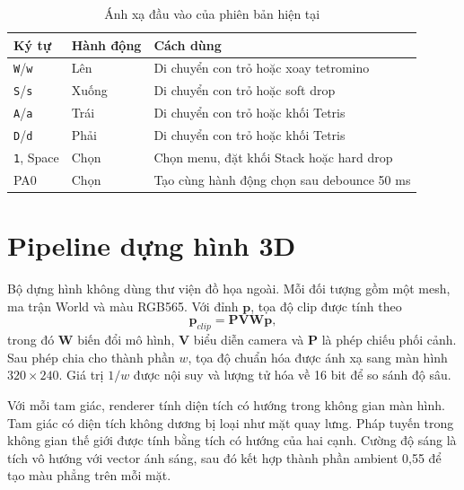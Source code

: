 \begin{table}[H]
  \centering
  \caption{Ánh xạ đầu vào của phiên bản hiện tại}
  \label{tab:controls}
  \begin{tabularx}{0.78\textwidth}{@{}C{0.18\textwidth}Y Y@{}}
    \toprule
    \textbf{Ký tự}        & \textbf{Hành động} & \textbf{Cách dùng}                         \\
    \midrule
    \texttt{W}/\texttt{w} & Lên                & Di chuyển con trỏ hoặc xoay tetromino      \\
    \texttt{S}/\texttt{s} & Xuống              & Di chuyển con trỏ hoặc soft drop           \\
    \texttt{A}/\texttt{a} & Trái               & Di chuyển con trỏ hoặc khối Tetris         \\
    \texttt{D}/\texttt{d} & Phải               & Di chuyển con trỏ hoặc khối Tetris         \\
    \texttt{1}, Space     & Chọn               & Chọn menu, đặt khối Stack hoặc hard drop   \\
    PA0                   & Chọn               & Tạo cùng hành động chọn sau debounce 50 ms \\
    \bottomrule
  \end{tabularx}
\end{table}

\section{Pipeline dựng hình 3D}

Bộ dựng hình không dùng thư viện đồ họa ngoài. Mỗi đối tượng gồm một mesh, ma trận World và màu RGB565. Với đỉnh $\mathbf{p}$, tọa độ clip được tính theo
\begin{equation}
  \mathbf{p}_{clip}=\mathbf{P}\mathbf{V}\mathbf{W}\mathbf{p},
  \label{eq:mvp}
\end{equation}
trong đó $\mathbf{W}$ biến đổi mô hình, $\mathbf{V}$ biểu diễn camera và $\mathbf{P}$ là phép chiếu phối cảnh. Sau phép chia cho thành phần $w$, tọa độ chuẩn hóa được ánh xạ sang màn hình $320\times240$. Giá trị $1/w$ được nội suy và lượng tử hóa về 16 bit để so sánh độ sâu.

Với mỗi tam giác, renderer tính diện tích có hướng trong không gian màn hình. Tam giác có diện tích không dương bị loại như mặt quay lưng. Pháp tuyến trong không gian thế giới được tính bằng tích có hướng của hai cạnh. Cường độ sáng là tích vô hướng với vector ánh sáng, sau đó kết hợp thành phần ambient 0,55 để tạo màu phẳng trên mỗi mặt.

